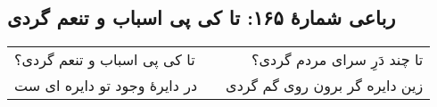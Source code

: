 \begin{center}
\section*{رباعی شمارهٔ ۱۶۵: تا کی پی اسباب و تنعم گردی}
\label{sec:165}
\begin{longtable}{l p{0.5cm} r}
تا کی پی اسباب و تنعم گردی؟
&&
تا چند دَرِ سرای مردم گردی؟
\\
در دایرهٔ وجود تو دایره ای ست
&&
زین دایره گر برون روی گم گردی
\\
\end{longtable}
\end{center}
